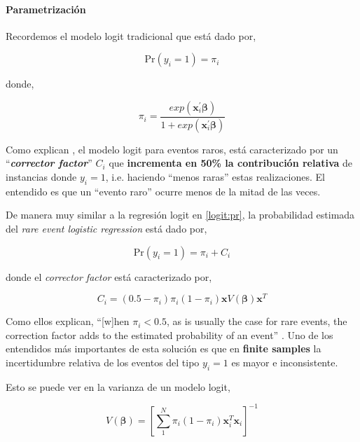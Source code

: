 \documentclass[onesided]{article}\usepackage[]{graphicx}\usepackage[]{color}
\begin{document}
\paragraph{Parametrizaci\'on} Recordemos el modelo logit tradicional que est\'a dado por,

\begin{equation}\label{logit:pr}
\text{Pr}(y_{i}=1)=\pi_{i}
\end{equation}


donde,


\begin{equation}\label{logit}
\pi_{i} = \frac{exp(\boldsymbol{x}_{i}^{\prime}\boldsymbol{\beta})}{1+exp(\boldsymbol{x}_{i}^{\prime}\boldsymbol{\beta})}
\end{equation}

Como explican \textcite[149]{King2001}, el modelo logit para eventos raros, est\'a caracterizado por un ``\emph{{\bf corrector factor}}'' $C_{i}$ que {\bf incrementa en 50\% la contribuci\'on relativa} de instancias donde $y_{i}=1$, i.e. haciendo ``menos raras'' estas realizaciones. El entendido es que un ``evento raro'' ocurre menos de la mitad de las veces. 

De manera muy similar a la regresi\'on logit en \autoref{logit:pr}, la probabilidad estimada del \emph{rare event logistic regression} est\'a dado por,

\begin{equation}\label{corrector:factor:1}
\text{Pr}(y_{i}=1)=\pi_{i} + C_{i}
\end{equation}

donde el \emph{corrector factor} est\'a caracterizado por,


\begin{equation}\label{corrector:factor:2}
C_{i} = (0.5-\pi_{i})\pi_{i}(1-\pi_{i})\boldsymbol{x}V(\boldsymbol{\beta})\boldsymbol{x}^{T}
\end{equation}

Como ellos explican, ``[w]hen $\pi_{i} < 0.5$, as is usually the case for rare events, the correction factor adds to the estimated probability of an event'' \parencite[149]{King2001}. Uno de los entendidos m\'as importantes de esta soluci\'on es que en {\bf finite samples} la incertidumbre relativa de los eventos del tipo $y_{i}=1$ es mayor e inconsistente. 

Esto se puede ver en la varianza de un modelo logit,

\begin{equation}\label{var:logit}
V(\boldsymbol{\beta}) = [\sum_{1}^{N}\pi_{i}(1-\pi_{i})\boldsymbol{x}_{i}^{T}\boldsymbol{x}_{i}]^{-1}
\end{equation}
\end{document}
